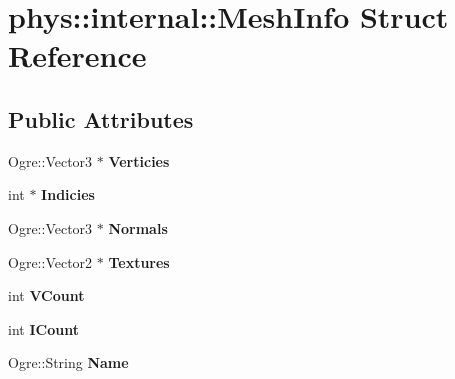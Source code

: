 \hypertarget{structphys_1_1internal_1_1MeshInfo}{
\section{phys::internal::MeshInfo Struct Reference}
\label{d2/d55/structphys_1_1internal_1_1MeshInfo}
}
\subsection*{Public Attributes}
\begin{DoxyCompactItemize}
\item 
\hypertarget{structphys_1_1internal_1_1MeshInfo_a1cac5cabd68a3b1d4baeb1d82acb0a48}{
Ogre::Vector3 $\ast$ {\bfseries Verticies}}
\label{d2/d55/structphys_1_1internal_1_1MeshInfo_a1cac5cabd68a3b1d4baeb1d82acb0a48}

\item 
\hypertarget{structphys_1_1internal_1_1MeshInfo_a8040d8df59b295a5e5dea82babdc3e20}{
int $\ast$ {\bfseries Indicies}}
\label{d2/d55/structphys_1_1internal_1_1MeshInfo_a8040d8df59b295a5e5dea82babdc3e20}

\item 
\hypertarget{structphys_1_1internal_1_1MeshInfo_a85dd83ee876c77062a82a296dffcd8c0}{
Ogre::Vector3 $\ast$ {\bfseries Normals}}
\label{d2/d55/structphys_1_1internal_1_1MeshInfo_a85dd83ee876c77062a82a296dffcd8c0}

\item 
\hypertarget{structphys_1_1internal_1_1MeshInfo_accf137d03c3a490fd26e57e5cc94c152}{
Ogre::Vector2 $\ast$ {\bfseries Textures}}
\label{d2/d55/structphys_1_1internal_1_1MeshInfo_accf137d03c3a490fd26e57e5cc94c152}

\item 
\hypertarget{structphys_1_1internal_1_1MeshInfo_a2a4643175037335c549b811a092c1b0c}{
int {\bfseries VCount}}
\label{d2/d55/structphys_1_1internal_1_1MeshInfo_a2a4643175037335c549b811a092c1b0c}

\item 
\hypertarget{structphys_1_1internal_1_1MeshInfo_a2ff4c05f43c2ab733734b4fb75cb72f2}{
int {\bfseries ICount}}
\label{d2/d55/structphys_1_1internal_1_1MeshInfo_a2ff4c05f43c2ab733734b4fb75cb72f2}

\item 
\hypertarget{structphys_1_1internal_1_1MeshInfo_abcad37b2517231227f8d187436e2f761}{
Ogre::String {\bfseries Name}}
\label{d2/d55/structphys_1_1internal_1_1MeshInfo_abcad37b2517231227f8d187436e2f761}


\end{DoxyCompactItemize}
